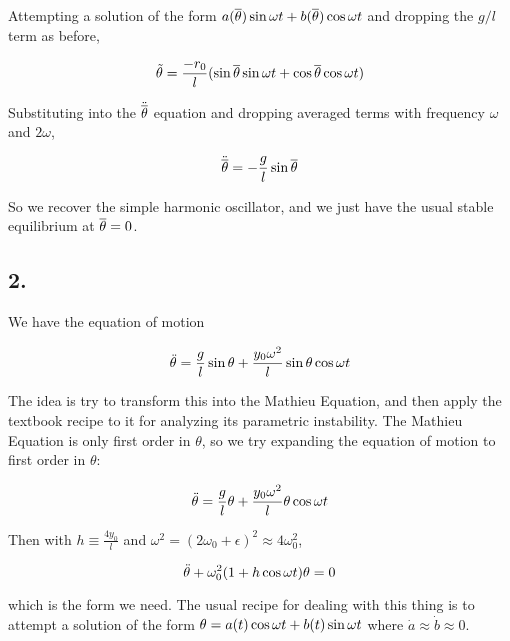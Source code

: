 \documentclass[12pt]{article}
\begin{document}
Attempting a solution of the form \( a(\overline{\theta})\sin\omega t + b(\overline{\theta})\cos\omega t\) and dropping the \(g/l\) term as before,

\[\tilde{\theta} =  \frac{-r_0}{l}(\sin\overline{\theta}\sin\omega t + \cos\overline{\theta}\cos\omega t)
\]

Substituting into the \(\ddot{\overline{\theta}}\) equation and dropping averaged terms with frequency \(\omega\) and \(2\omega\),

\[\ddot{\overline{\theta}} = -\frac{g}{l}\sin\overline{\theta}
\]

So we recover the simple harmonic oscillator, and we just have the usual stable equilibrium at \(\overline{\theta} = 0\).

\pagebreak

\subsection*{2.}

We have the equation of motion

\[\ddot{\theta} = \frac{g}{l}\sin\theta + \frac{y_0\omega^2}{l}\sin\theta\cos\omega t
\]

The idea is try to transform this into the Mathieu  Equation, and then apply the textbook recipe to it for analyzing its parametric instability. The Mathieu Equation is only first order in \(\theta\), so we try expanding the equation of motion to first order in \(\theta\):

\[\ddot{\theta} = \frac{g}{l}\theta + \frac{y_0\omega^2}{l}\theta\cos\omega t
\]

Then with \(h\equiv \frac{4y_0}{l}\) and \(\omega^2 = (2\omega_0+\epsilon)^2 \approx 4\omega_0^2\),

\[\ddot{\theta} + \omega_0^2(1+h\cos\omega t)\theta = 0
\]

which is the form we need. The usual recipe for dealing with this thing is to attempt a solution of the form \(\theta = a(t)\cos\omega t + b(t)\sin\omega t \) where \(\dot{a}\approx\dot{b}\approx0\).
\end{document}

